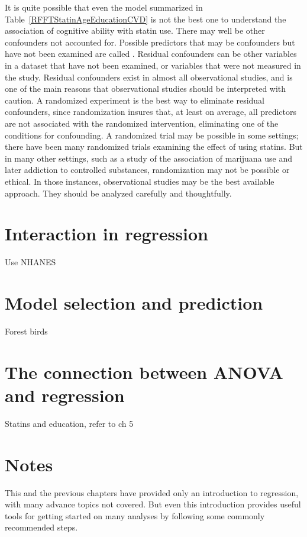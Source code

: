It is quite possible that even the model summarized in
Table~\ref{RFFTStatinAgeEducationCVD} is not the best one to understand
the association of cognitive ability with statin use.  There may well be
other confounders not accounted for.  Possible predictors that may be
confounders but have not been examined are called .  Residual confounders can be other variables in a dataset
that have not been examined, or variables that were not measured in the
study.  Residual confounders exist in almost all observational studies,
and is one of the main reasons that observational studies should be
interpreted with caution.  A randomized experiment is the best way to
eliminate residual confounders, since randomization insures that, at
least on average, all predictors are not associated with the randomized
intervention, eliminating one of the conditions for confounding.  A
randomized trial may be possible in some settings; there have been many
randomized trials examining the effect of using statins. But in many
other settings, such as a study of the association of marijuana use and
later addiction to controlled substances, randomization may not be
possible or ethical.  In those instances, observational studies may be
the best available approach. They should be analyzed carefully and
thoughtfully.

\section{Interaction in regression}

Use NHANES

\section{Model selection and prediction}

Forest birds

\section{The connection between ANOVA and regression}

Statins and education, refer to ch 5


\section{Notes}

This and the previous chapters have provided only an introduction to regression, with many advance topics not covered. But even this introduction provides useful tools for getting started on many analyses by following some commonly recommended steps.

